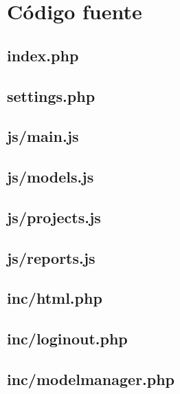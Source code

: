 \documentclass[11pt,a4paper,spanish,twoside]{book}
\begin{document}
\section{Código fuente}
\subsection{index.php}


\subsection{settings.php}


\subsection{js/main.js}


\subsection{js/models.js}


\subsection{js/projects.js}


\subsection{js/reports.js}


\subsection{inc/html.php}


\subsection{inc/loginout.php}


\subsection{inc/modelmanager.php}

\end{document}
